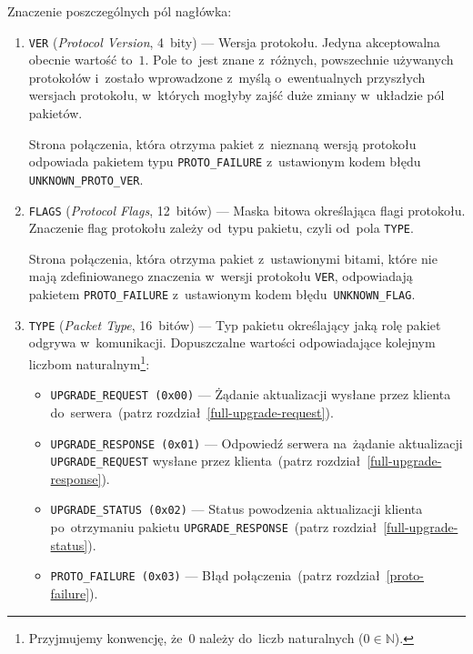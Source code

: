 \documentclass[thesis]{subfiles}
\begin{document}
Znaczenie poszczególnych pól nagłówka:\mynobreakpar
\begin{enumerate}
	\item \texttt{VER} (\emph{Protocol Version}, 4~bity) --- Wersja protokołu. Jedyna akceptowalna obecnie wartość to~$1$. Pole to~jest znane z~różnych, powszechnie używanych protokołów i~zostało wprowadzone z~myślą o~ewentualnych przyszłych wersjach protokołu, w~których mogłyby zajść duże zmiany w~układzie pól pakietów.

	Strona połączenia, która otrzyma pakiet z~nieznaną wersją protokołu odpowiada pakietem typu \texttt{PROTO\_FAILURE} z~ustawionym kodem błędu \texttt{UNKNOWN\_PROTO\_VER}.

	\item \texttt{FLAGS} (\emph{Protocol Flags}, 12~bitów) --- Maska bitowa określająca flagi protokołu. Znaczenie flag protokołu zależy od~typu pakietu, czyli od~pola \texttt{TYPE}.

	Strona połączenia, która otrzyma pakiet z~ustawionymi bitami, które nie mają zdefiniowanego znaczenia w~wersji protokołu \texttt{VER}, odpowiadają pakietem \texttt{PROTO\_FAILURE} z~ustawionym kodem błędu~\texttt{UNKNOWN\_FLAG}.

	\item \texttt{TYPE} (\emph{Packet Type}, 16~bitów) --- Typ pakietu określający jaką rolę pakiet odgrywa w~komunikacji. Dopuszczalne wartości odpowiadające kolejnym liczbom naturalnym\footnote{Przyjmujemy konwencję, że~$0$ należy do~liczb naturalnych ($0\in\mathbb{N}$).}:
	\begin{itemize}
		\item \texttt{UPGRADE\_REQUEST (0x00)} --- Żądanie aktualizacji wysłane przez klienta do~serwera~(patrz rozdział~\ref{full-upgrade-request}).
		\item \texttt{UPGRADE\_RESPONSE (0x01)} --- Odpowiedź serwera na~żądanie aktualizacji \texttt{UPGRADE\_REQUEST} wysłane przez klienta~(patrz rozdział~\ref{full-upgrade-response}).
		\item \texttt{UPGRADE\_STATUS (0x02)} --- Status powodzenia aktualizacji klienta po~otrzymaniu pakietu \texttt{UPGRADE\_RESPONSE}~(patrz rozdział~\ref{full-upgrade-status}).
		\item \texttt{PROTO\_FAILURE (0x03)} --- Błąd połączenia~(patrz rozdział~\ref{proto-failure}).
	\end{itemize}


\end{enumerate}
\end{document}
